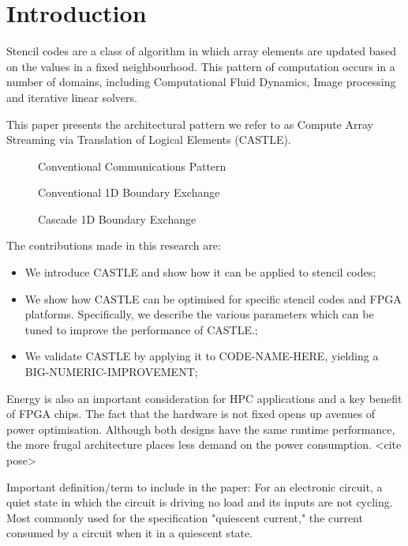 \section{Introduction}
Stencil codes are a class of algorithm in which array elements are updated based on the values in a fixed neighbourhood.
This pattern of computation occurs in a number of domains, including Computational Fluid Dynamics, Image processing and iterative linear solvers.

This paper presents the architectural pattern we refer to as Compute Array Streaming via Translation of Logical Elements (CASTLE).

\begin{figure}
  \centering
  
  \caption{Conventional Communications Pattern}
  \label{fig:convcomms}
\end{figure}

\begin{figure}
  \centering
  
  \caption{Conventional 1D Boundary Exchange}
  \label{fig:exch1dold}
\end{figure}


\begin{figure}
  \centering
  
  \caption{Cascade 1D Boundary Exchange}
  \label{fig:trans1d}
\end{figure}


The contributions made in this research are:
\begin{itemize}
  \item{We introduce CASTLE and show how it can be applied to stencil codes;}
  \item{We show how CASTLE can be optimised for specific stencil codes and FPGA platforms.
        Specifically, we describe the various parameters which can be tuned to improve the performance of CASTLE.;}
  \item{We validate CASTLE by applying it to CODE-NAME-HERE, yielding a BIG-NUMERIC-IMPROVEMENT;}
\end{itemize}

Energy is also an important consideration for HPC applications and a key benefit of FPGA chips.
The fact that the hardware is not fixed opens up avenues of power optimisation.
Although both designs have the same runtime performance, the more frugal architecture places less demand on the power consumption.
<cite pose>

Important definition/term to include in the paper:
For an electronic circuit, a quiet state in which the circuit is driving no load and its inputs are not cycling. Most commonly used for the specification "quiescent current," the current consumed by a circuit when it in a quiescent state.

